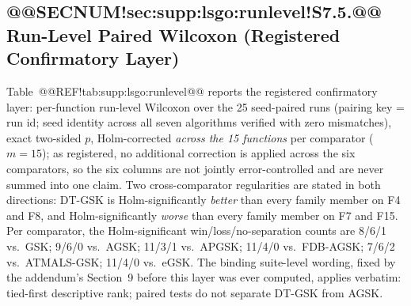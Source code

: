 \documentclass[10pt,a4paper]{article}
\newcommand{\dtgsk}{DT-GSK}
\newcommand{\agsk}{AGSK}
\begin{document}
\subsection{@@SECNUM!sec:supp:lsgo:runlevel!S7.5.@@ Run-Level Paired Wilcoxon (Registered Confirmatory Layer)}\label{sec:supp:lsgo:runlevel}

Table~@@REF!tab:supp:lsgo:runlevel@@ reports the registered confirmatory
layer: per-function run-level Wilcoxon over the 25 seed-paired runs
(pairing key = run id; seed identity across all seven algorithms verified
with zero mismatches), exact two-sided $p$, Holm-corrected \emph{across
the 15 functions} per comparator ($m = 15$); as registered, no additional
correction is applied across the six comparators, so the six columns are
not jointly error-controlled and are never summed into one claim.  Two
cross-comparator regularities are stated in both directions: \dtgsk{} is
Holm-significantly \emph{better} than every family member on F4 and F8,
and Holm-significantly \emph{worse} than every family member on F7 and
F15.  Per comparator, the Holm-significant win/loss/no-separation counts
are 8/6/1 vs.\ GSK; 9/6/0 vs.\ AGSK; 11/3/1 vs.\ APGSK; 11/4/0 vs.\ FDB-AGSK; 7/6/2 vs.\ ATMALS-GSK; 11/4/0 vs.\ eGSK.
The binding suite-level wording, fixed by the addendum's Section~9 before
this layer was ever computed, applies verbatim: tied-first descriptive
rank; paired tests do not separate \dtgsk{} from \agsk{}.
\end{document}
